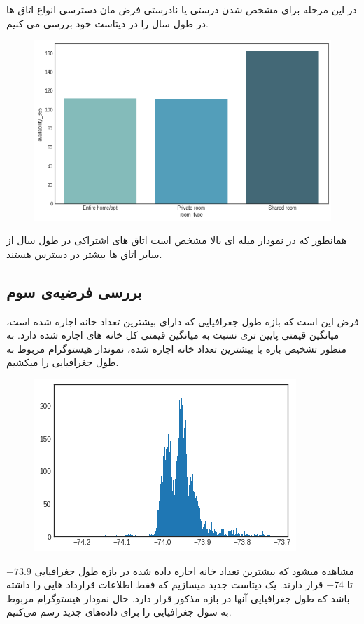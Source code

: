 \documentclass[table]{article}
\begin{document}
	\noindent در این مرحله برای مشخص شدن درستی یا نادرستی فرض مان دسترسی انواع اتاق ها در طول سال را در دیتاست خود بررسی می کنیم. 
	\begin{figure}[h!]
		\centering
		\includegraphics[scale=.5]{./graph11.png}
		\caption{}
	\end{figure}

	همانطور که در نمودار میله ای بالا مشخص است اتاق های اشتراکی در طول سال از سایر اتاق ها بیشتر در دسترس هستند. 
	\subsection{بررسی فرضیه‌ی سوم}
	فرض این است که بازه طول جغرافیایی که دارای بیشترین تعداد خانه اجاره شده است، میانگین قیمتی پایین تری نسبت به میانگین قیمتی کل خانه های اجاره شده دارد. به منظور تشخیص بازه با بیشترین تعداد خانه اجاره شده، نموندار هیستوگرام مربوط به طول جغرافیایی را میکشیم.
	\begin{figure}[h!]
		\centering
		\includegraphics[scale=.6]{./graph9.png}
		\caption{}
	\end{figure}

	مشاهده میشود که بیشترین تعداد خانه اجاره داده شده در بازه طول جغرافیایی 
	$-73.9$
	تا 
	$-74$
	قرار دارند. یک دیتاست جدید میسازیم که فقط اطلاعات قرارداد هایی را داشته باشد که طول جغرافیایی آنها در بازه مذکور قرار دارد. حال نمودار هیستوگرام مربوط به سول جغرافیایی را برای داده‌های جدید رسم می‌کنیم.
	
\end{document}
